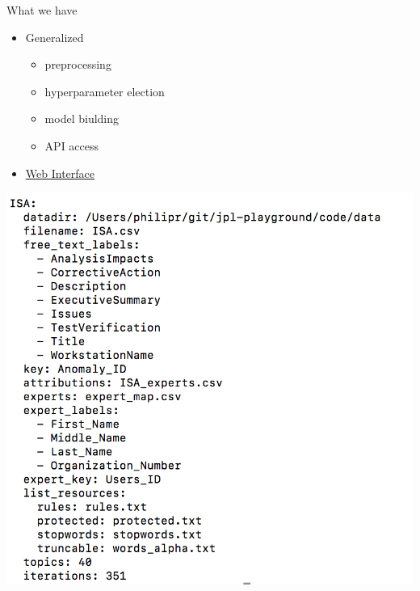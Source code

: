 \documentclass[10pt]{beamer}
\begin{document}
\begin{frame}{What we have}
  \begin{multicols}{2}
  \begin{itemize}
  \item Generalized
    \begin{itemize}
    \item preprocessing
    \item hyperparameter election
    \item model biulding
    \item API access
    \end{itemize}
  \item \hyperlink{file:///Users/philipr/git/jpl-playground/code/site/index.html}{Web Interface}
  \end{itemize}

  \columnbreak

  \includegraphics[width=\columnwidth]{./config.png}
  \end{multicols}
\end{frame}
\end{document}

